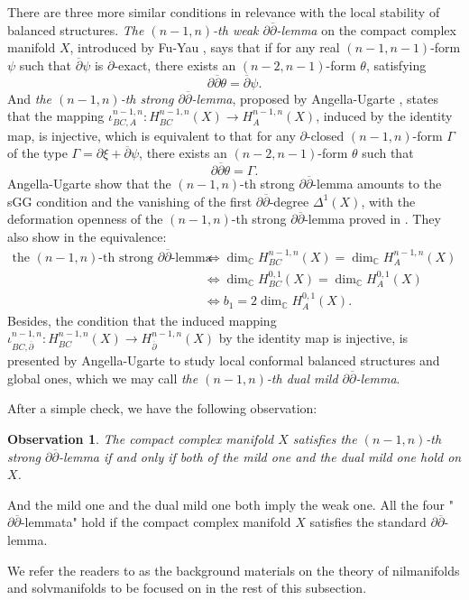 \documentclass[12pt]{amsart}
\numberwithin{equation}{section}
\newtheorem{observation}  [theorem]     {Observation}
\renewcommand{\1}{\mathds{1}}
\newcommand{\db}{\overline{\partial}}
\renewcommand{\>}{\rightarrow}
\newcommand{\p}{\partial}
\def\p{\partial}
\begin{document}
There are three more similar conditions in relevance with the local
stability of balanced structures. \emph{The $(n-1,n)$-th weak
$\p\db$-lemma} on the compact complex manifold $X$, introduced by
Fu-Yau \cite{FY}, says that if for any real $(n-1,n-1)$-form $\psi$
such that $\db \psi$ is $\p$-exact, there exists an $(n-2,n-1)$-form
$\theta$, satisfying
\[ \p \db \theta = \db \psi. \]
And \emph{the $(n-1,n)$-th strong $\p\db$-lemma}, proposed by
Angella-Ugarte \cite{au}, states that the mapping
$\iota^{n-1,n}_{BC,A}: H^{n-1,n}_{BC}(X) \rightarrow
H^{n-1,n}_{A}(X)$, induced by the identity map, is injective, which
is equivalent to that for any $\p$-closed $(n-1,n)$-form $\Gamma$ of
the type $\Gamma=\p\xi+\db \psi$, there exists an $(n-2,n-1)$-form
$\theta$ such that
\[ \p \db \theta = \Gamma. \]
Angella-Ugarte \cite[Theorem 3.1]{au} show that the $(n-1,n)$-th
strong $\p\db$-lemma amounts to the sGG condition and the vanishing
of the first $\p\db$-degree $\Delta^1(X)$, with the deformation
openness of the $(n-1,n)$-th strong $\p\db$-lemma proved in
\cite[Proposition 4.8]{au}. They also show in \cite[Corollary
3.3]{au} the equivalence:
\[ \begin{aligned}
\text{the $(n-1,n)$-th strong $\p\db$-lemma}
&\Longleftrightarrow \dim_{\mathbb{C}}H^{n-1,n}_{BC}(X) = \dim_{\mathbb{C}}H^{n-1,n}_{A}(X) \\
&\Longleftrightarrow \dim_{\mathbb{C}}H^{0,1}_{BC}(X) = \dim_{\mathbb{C}}H^{0,1}_{A}(X) \\
&\Longleftrightarrow b_1=2\dim_{\mathbb{C}}H^{0,1}_{A}(X).
\end{aligned}\]
Besides, the condition that the induced mapping
$\iota^{n-1,n}_{BC,\db}: H^{n-1,n}_{BC}(X) \rightarrow
H^{n-1,n}_{\db}(X)$ by the identity map is injective, is presented
by Angella-Ugarte \cite{AU} to study local conformal balanced
structures and global ones, which we may call \emph{the $(n-1,n)$-th
dual mild $\p\db$-lemma}.

After a simple check, we have the following observation:
\begin{observation}\label{s-eq}
\emph{The compact complex manifold $X$ satisfies the $(n-1,n)$-th
strong $\p\db$-lemma if and only if both of the mild one and the
dual mild one hold on $X$.}
\end{observation}
And the mild one and the dual mild one both imply the weak one. All
the four "$\p\db$-lemmata" hold if the compact complex manifold $X$
satisfies the standard $\p\db$-lemma.

We refer the readers to \cite{R,UV,LUV,AK} as the background
materials on the theory of nilmanifolds and solvmanifolds to be
focused on in the rest of this subsection.
\end{document}
